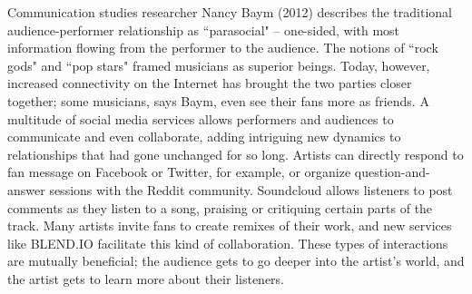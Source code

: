 Communication studies researcher Nancy Baym (2012) describes the traditional audience-performer relationship as ``parasocial" -- one-sided, with most information flowing from the performer to the audience. The notions of ``rock gods" and ``pop stars" framed musicians as superior beings. Today, however, increased connectivity on the Internet has brought the two parties closer together; some musicians, says Baym, even see their fans more as friends. A multitude of social media services allows performers and audiences to communicate and even collaborate, adding intriguing new dynamics to relationships that had gone unchanged for so long. Artists can directly respond to fan message on Facebook or Twitter, for example, or organize question-and-answer sessions with the Reddit community. Soundcloud allows listeners to post comments as they listen to a song, praising or critiquing certain parts of the track. Many artists invite fans to create remixes of their work, and new services like BLEND.IO facilitate this kind of collaboration. These types of interactions are mutually beneficial; the audience gets to go deeper into the artist's world, and the artist gets to learn more about their listeners.

